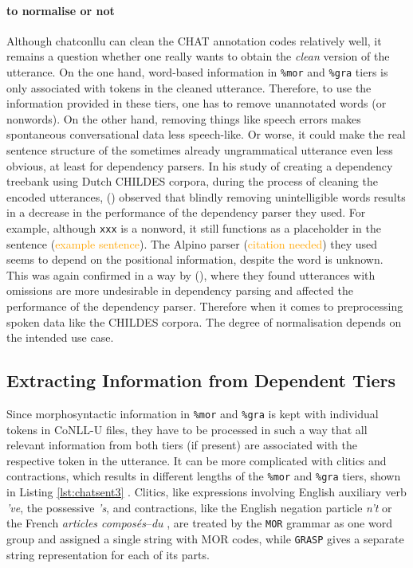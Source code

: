 \paragraph{to normalise or not} Although chatconllu can clean the CHAT annotation codes relatively well, it remains a question whether one really wants to obtain the \emph{clean} version of the utterance. On the one hand, word-based information in \texttt{\%mor} and \texttt{\%gra} tiers is only associated with tokens in the cleaned utterance. Therefore, to use the information provided in these tiers, one has to remove unannotated words (or nonwords). On the other hand, removing things like speech errors makes spontaneous conversational data less speech-like. Or worse, it could make the real sentence structure of the sometimes already ungrammatical utterance even less obvious, at least for dependency parsers. In his study of creating a dependency treebank using Dutch CHILDES corpora, during the process of cleaning the encoded utterances, (\cite{odijk2018anncor}) observed that blindly removing unintelligible words results in a decrease in the performance of the dependency parser they used. For example, although \texttt{xxx} is a nonword, it still functions as a placeholder  in the sentence (\textcolor{orange}{example sentence}). The Alpino parser (\textcolor{orange}{citation needed})  they used seems to depend on the positional information, despite the word is unknown. This was again confirmed in a way by (\cite{liu2021}), where they found utterances with omissions are more undesirable in dependency parsing and affected the performance of the dependency parser. Therefore when it comes to preprocessing spoken data like the CHILDES corpora. The degree of normalisation depends on the intended use case.

\subsection{Extracting Information from Dependent Tiers}

Since morphosyntactic information in \texttt{\%mor} and \texttt{\%gra} is kept with individual tokens in CoNLL-U files, they have to be processed in such a way that all relevant information from both tiers (if present) are associated with the respective token in the utterance. It can be more complicated with clitics and contractions, which results in different lengths of the \texttt{\%mor} and \texttt{\%gra} tiers, shown in Listing \ref{lst:chatsent3} . Clitics, like expressions involving English auxiliary verb \emph{'ve}, the possessive \emph{'s}, and contractions, like the English negation particle \emph{n't} or the French \emph{articles composés}--\emph{du} , are treated by the \texttt{MOR} grammar as one word group and assigned a single string with MOR codes, while \texttt{GRASP} gives a separate string representation for each of its parts.\\

